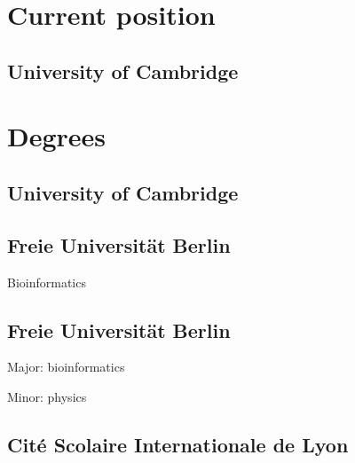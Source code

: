 \documentclass{klmr-cv}
\author{Konrad Rudolph}
\begin{document}
\maketitle

\sidebar

\section{Current position}

\subsection{University of Cambridge}

\date{2016--2017}
\item{}

\section{Degrees}

\subsection{University of Cambridge}

\date{2015}
\item{}

\subsection{Freie Universität Berlin}

\date{2011}
\item{}
\item{Bioinformatics}

\subsection{Freie Universität Berlin}

\date{2008}
\item{}
\item{Major: bioinformatics}
\item{Minor: physics}

\subsection{\textfrench{Cité Scolaire Internationale de Lyon}}
\end{document}
